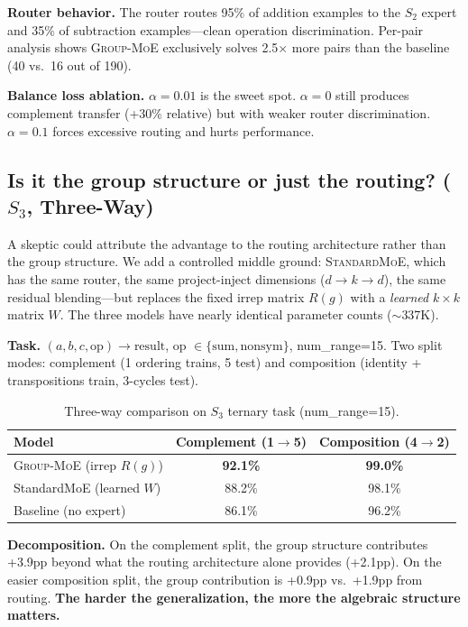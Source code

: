 \documentclass[10pt, letterpaper]{article}
\newcommand{\Rg}{R(g)}
\newcommand{\gmoe}{\textsc{Group-MoE}}
\begin{document}
\textbf{Router behavior.} The router routes 95\% of addition examples to the $S_2$ expert and 35\% of subtraction examples---clean operation discrimination. Per-pair analysis shows \gmoe{} exclusively solves 2.5$\times$ more pairs than the baseline (40 vs.\ 16 out of 190).

\textbf{Balance loss ablation.} $\alpha = 0.01$ is the sweet spot. $\alpha = 0$ still produces complement transfer (+30\% relative) but with weaker router discrimination. $\alpha = 0.1$ forces excessive routing and hurts performance.


\subsection{Is it the group structure or just the routing? ($S_3$, Three-Way)}
\label{sec:exp-threeway}

A skeptic could attribute the advantage to the routing architecture rather than the group structure. We add a controlled middle ground: \textsc{StandardMoE}, which has the same router, the same project-inject dimensions ($d \to k \to d$), the same residual blending---but replaces the fixed irrep matrix $\Rg$ with a \emph{learned} $k \times k$ matrix $W$. The three models have nearly identical parameter counts ($\sim$337K).

\textbf{Task.} $(a, b, c, \text{op}) \to \text{result}$, op $\in \{\text{sum}, \text{nonsym}\}$, num\_range=15. Two split modes: complement (1 ordering trains, 5 test) and composition (identity + transpositions train, 3-cycles test).

\begin{table}[h]
\centering
\caption{Three-way comparison on $S_3$ ternary task (num\_range=15).}
\label{tab:threeway}
\begin{tabular}{lcc}
\toprule
Model & Complement (1$\to$5) & Composition (4$\to$2) \\
\midrule
\gmoe{} (irrep $\Rg$) & \textbf{92.1\%} & \textbf{99.0\%} \\
StandardMoE (learned $W$) & 88.2\% & 98.1\% \\
Baseline (no expert) & 86.1\% & 96.2\% \\
\bottomrule
\end{tabular}
\end{table}

\textbf{Decomposition.} On the complement split, the group structure contributes +3.9pp beyond what the routing architecture alone provides (+2.1pp). On the easier composition split, the group contribution is +0.9pp vs.\ +1.9pp from routing. \textbf{The harder the generalization, the more the algebraic structure matters.}
\end{document}
